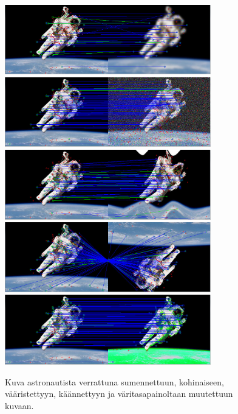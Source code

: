 \documentclass[12pt,a4paper,titlepage]{article}
\begin{document}
\begin{figure}
\centering 
\includegraphics[width=0.8\textwidth]{kuvat/blurnautti.jpg}
\includegraphics[width=0.8\textwidth]{kuvat/noise.jpg}
\includegraphics[width=0.8\textwidth]{kuvat/vaaristys.jpg}
\includegraphics[width=0.8\textwidth]{kuvat/kaanto.jpg}
\includegraphics[width=0.8\textwidth]{kuvat/vari.jpg}
\caption{Kuva astronautista verrattuna sumennettuun, kohinaiseen, vääristettyyn, käännettyyn ja väritasapainoltaan muutettuun kuvaan.}
\label{nautit}
\end{figure}
\end{document}
